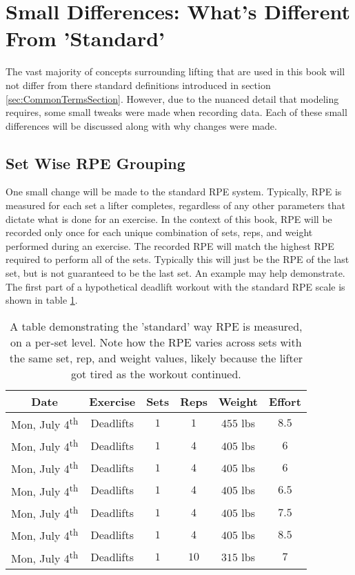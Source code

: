 \section{Small Differences: What's Different From 'Standard'}
\label{sec:SmallDifferencesSection}

The vast majority of concepts surrounding lifting that are used in this book will not differ from there standard definitions introduced in section \ref{sec:CommonTermsSection}. However, due to the nuanced detail that modeling requires, some small tweaks were made when recording data. Each of these small differences will be discussed along with why changes were made.

\subsection{Set Wise RPE Grouping}
\label{sec:SetWiseRPEGrouping}

One small change will be made to the standard RPE system. Typically, RPE is measured for each set a lifter completes, regardless of any other parameters that dictate what is done for an exercise. In the context of this book, RPE will be recorded only once for each unique combination of sets, reps, and weight performed during an exercise. The recorded RPE will match the highest RPE required to perform all of the sets. Typically this will just be the RPE of the last set, but is not guaranteed to be the last set. An example may help demonstrate. The first part of a hypothetical deadlift workout with the standard RPE scale is shown in table \ref{tab:StandardRPEExample}.

\begin{table}[h]
	\centering
	\begin{tabular}{c|c|c|c|c|c}
		Date & Exercise & Sets & Reps & Weight & Effort \\
        \hline
        Mon, July 4\textsuperscript{th} & Deadlifts & $1$ & $1$ & $455$ lbs & $8.5$ \\
        Mon, July 4\textsuperscript{th} & Deadlifts & $1$ & $4$ & $405$ lbs & $6$ \\
        Mon, July 4\textsuperscript{th} & Deadlifts & $1$ & $4$ & $405$ lbs & $6$ \\
        Mon, July 4\textsuperscript{th} & Deadlifts & $1$ & $4$ & $405$ lbs & $6.5$ \\
        Mon, July 4\textsuperscript{th} & Deadlifts & $1$ & $4$ & $405$ lbs & $7.5$ \\
        Mon, July 4\textsuperscript{th} & Deadlifts & $1$ & $4$ & $405$ lbs & $8.5$ \\
        Mon, July 4\textsuperscript{th} & Deadlifts & $1$ & $10$ & $315$ lbs & $7$ \\
	\end{tabular}
	\caption{A table demonstrating the 'standard' way RPE is measured, on a per-set level. Note how the RPE varies across sets with the same set, rep, and weight values, likely because the lifter got tired as the workout continued.}
	\label{tab:StandardRPEExample}
\end{table}

